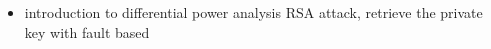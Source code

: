 \documentclass[]{article}
\begin{document}
\begin{itemize}
	\item \cite{kocher2011introduction} introduction to differential power analysis
	\itme \cite{pellegrini2010fault} RSA attack, retrieve the private key with fault based  
\end{itemize}

{}

\end{document}
